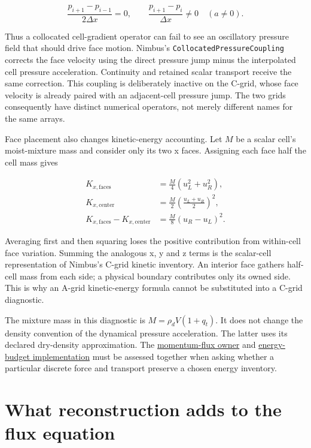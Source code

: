 \documentclass[
  11pt,
]{report}
\begin{document}
\[\frac{p_{i+1}-p_{i-1}}{2\Delta x}=0,
\qquad
\frac{p_{i+1}-p_i}{\Delta x}\ne 0\quad(a\ne0).\]

Thus a collocated cell-gradient operator can fail to see an oscillatory
pressure field that should drive face motion. Nimbus's
\texttt{CollocatedPressureCoupling} corrects the face velocity using the
direct pressure jump minus the interpolated cell pressure acceleration.
Continuity and retained scalar transport receive the same correction.
This coupling is deliberately inactive on the C-grid, whose face
velocity is already paired with an adjacent-cell pressure jump. The two
grids consequently have distinct numerical operators, not merely
different names for the same arrays.

Face placement also changes kinetic-energy accounting. Let \(M\) be a
scalar cell's moist-mixture mass and consider only its two x faces.
Assigning each face half the cell mass gives

\[\begin{aligned}
K_{x,\mathrm{faces}} &= \frac{M}{4}(u_L^2+u_R^2), \\
K_{x,\mathrm{center}} &= \frac{M}{2}
                         \left(\frac{u_L+u_R}{2}\right)^2, \\
K_{x,\mathrm{faces}}-K_{x,\mathrm{center}}
                    &= \frac{M}{8}(u_R-u_L)^2.
\end{aligned}\]

Averaging first and then squaring loses the positive contribution from
within-cell face variation. Summing the analogous x, y and z terms is
the scalar-cell representation of Nimbus's C-grid kinetic inventory. An
interior face gathers half-cell mass from each side; a physical boundary
contributes only its owned side. This is why an A-grid kinetic-energy
formula cannot be substituted into a C-grid diagnostic.

The mixture mass in this diagnostic is \(M=\rho_dV(1+q_t)\). It does not
change the density convention of the dynamical pressure acceleration.
The latter uses its declared dry-density approximation. The
\href{../src/dynamics/cartesian_cgrid_momentum_flux.cpp}{momentum-flux
owner} and
\href{../src/diagnostics/budgets/energy_budget.cpp}{energy-budget
implementation} must be assessed together when asking whether a
particular discrete force and transport preserve a chosen energy
inventory.

\section{What reconstruction adds to the flux
equation}\label{what-reconstruction-adds-to-the-flux-equation}
\end{document}
